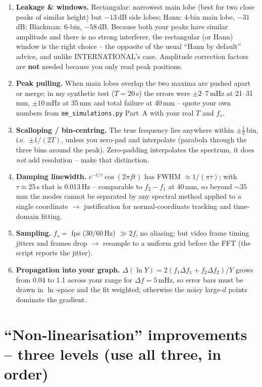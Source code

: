 \documentclass[11pt,a4paper]{article}
\newcommand{\Y}{Y}                                   %
\begin{document}
\begin{enumerate}
\item \textbf{Leakage \& windows.} Rectangular: narrowest main lobe (best for two close
peaks of similar height) but $-13$\,dB side lobes; Hann: 4-bin main lobe, $-31$\,dB;
Blackman: 6-bin, $-58$\,dB. Because both your peaks have similar amplitude and there is no
strong interferer, the rectangular (or Hann) window is the right choice -- the opposite of
the usual ``Hann by default'' advice, and unlike INTERNATIONAL's case. Amplitude
correction factors are \textbf{not} needed because you only read peak positions.
\item \textbf{Peak pulling.} When main lobes overlap the two maxima are pushed apart or
merge; in my synthetic test ($T=20$\,s) the errors were $\pm2$--7\,mHz at 21--31\,mm,
$\pm10$\,mHz at 35\,mm and total failure at 40\,mm -- quote your own numbers from
\texttt{ee\_simulations.py} Part~A with your real $T$ and $f_s$.
\item \textbf{Scalloping / bin-centring.} The true frequency lies anywhere within
$\pm\tfrac12$\,bin, i.e.\ $\pm1/(2T)$, unless you zero-pad and interpolate (parabola
through the three bins around the peak). Zero-padding interpolates the spectrum, it does
\emph{not} add resolution -- make that distinction.
\item \textbf{Damping linewidth.} $e^{-t/\tau}\cos(2\pi ft)$ has FWHM $\approx1/(\pi\tau)$;
with $\tau\approx25$\,s that is 0.013\,Hz -- comparable to $f_2-f_1$ at 40\,mm, so beyond
$\sim35$\,mm the modes cannot be separated by any spectral method applied to a single
coordinate $\to$ justification for normal-coordinate tracking and time-domain fitting.
\item \textbf{Sampling.} $f_s=$ fps (30/60\,Hz) $\gg2f$, no aliasing; but video frame timing
jitters and frames drop $\to$ resample to a uniform grid before the FFT (the script reports
the jitter).
\item \textbf{Propagation into your graph.}
$\Delta(\ln\Y)=2(f_1\Delta f_1+f_2\Delta f_2)/\Y$ grows from 0.04 to 1.1 across your range
for $\Delta f=5$\,mHz, so error bars must be drawn in $\ln$-space and the fit weighted;
otherwise the noisy large-$d$ points dominate the gradient.
\end{enumerate}

\section{``Non-linearisation'' improvements -- three levels (use all three, in order)}
\end{document}

